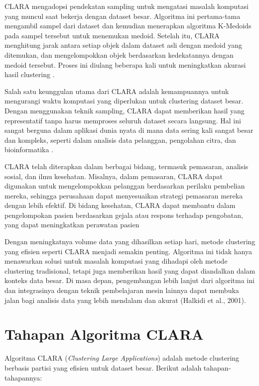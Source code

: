 \documentclass[
  oneside]{book}
\begin{document}
CLARA mengadopsi pendekatan sampling untuk mengatasi masalah komputasi
yang muncul saat bekerja dengan dataset besar. Algoritma ini
pertama-tama mengambil sampel dari dataset dan kemudian menerapkan
algoritma K-Medoids pada sampel tersebut untuk menemukan medoid. Setelah
itu, CLARA menghitung jarak antara setiap objek dalam dataset asli
dengan medoid yang ditemukan, dan mengelompokkan objek berdasarkan
kedekatannya dengan medoid tersebut. Proses ini diulang beberapa kali
untuk meningkatkan akurasi hasil clustering \citep{kaufman1990finding}.

Salah satu keunggulan utama dari CLARA adalah kemampuannya untuk
mengurangi waktu komputasi yang diperlukan untuk clustering dataset
besar. Dengan menggunakan teknik sampling, CLARA dapat memberikan hasil
yang representatif tanpa harus memproses seluruh dataset secara
langsung. Hal ini sangat berguna dalam aplikasi dunia nyata di mana data
sering kali sangat besar dan kompleks, seperti dalam analisis data
pelanggan, pengolahan citra, dan bioinformatika \citep{halkidi2001cluster}.

CLARA telah diterapkan dalam berbagai bidang, termasuk pemasaran,
analisis sosial, dan ilmu kesehatan. Misalnya, dalam pemasaran, CLARA
dapat digunakan untuk mengelompokkan pelanggan berdasarkan perilaku
pembelian mereka, sehingga perusahaan dapat menyesuaikan strategi
pemasaran mereka dengan lebih efektif. Di bidang kesehatan, CLARA dapat
membantu dalam pengelompokan pasien berdasarkan gejala atau respons
terhadap pengobatan, yang dapat meningkatkan perawatan pasien

Dengan meningkatnya volume data yang dihasilkan setiap hari, metode
clustering yang efisien seperti CLARA menjadi semakin penting. Algoritma
ini tidak hanya menawarkan solusi untuk masalah komputasi yang dihadapi
oleh metode clustering tradisional, tetapi juga memberikan hasil yang
dapat diandalkan dalam konteks data besar. Di masa depan, pengembangan
lebih lanjut dari algoritma ini dan integrasinya dengan teknik
pembelajaran mesin lainnya dapat membuka jalan bagi analisis data yang
lebih mendalam dan akurat (Halkidi et al., 2001).

\section{Tahapan Algoritma CLARA}\label{tahapan-algoritma-clara}

Algoritma CLARA (\emph{Clustering Large Applications}) adalah metode clustering berbasis partisi yang efisien untuk dataset besar. Berikut adalah tahapan-tahapannya:
\end{document}
